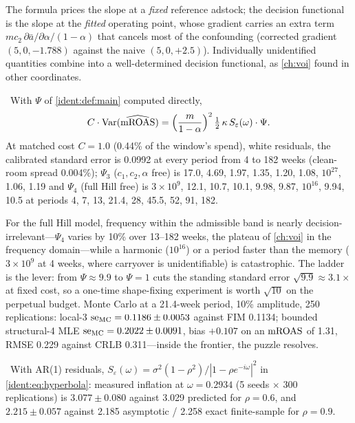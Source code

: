 The formula prices the slope at a \emph{fixed} reference adstock; the decision functional is the slope at the \emph{fitted} operating point, whose gradient carries an extra term $mc_2\,\partial\bar a/\partial\alpha/(1-\alpha)$ that cancels most of the confounding (corrected gradient $(5, 0, -1.788)$ against the naive $(5, 0, +2.5)$). Individually unidentified quantities combine into a well-determined decision functional, as \cref{ch:voi} found in other coordinates.

\begin{construction}
\label{ident:con:ladder}
\tagNumerical\ With $\Psi$ of \cref{ident:def:main} computed directly,
\begin{equation}
C\cdot\operatorname{Var}(\widehat{\mathrm{mROAS}}) = \Big(\frac{m}{1-\alpha}\Big)^2\,\tfrac12\,\kappa\,S_\varepsilon(\omega)\cdot\Psi.
\label{ident:eq:decisionfrontier}
\end{equation}
At matched cost $C = 1.0$ (0.44\% of the window's spend), white residuals, the calibrated standard error is 0.0992 at every period from 4 to 182 weeks (clean-room spread 0.004\%); $\Psi_3$ ($c_1, c_2, \alpha$ free) is 17.0, 4.69, 1.97, 1.35, 1.20, 1.08, $10^{27}$, 1.06, 1.19 and $\Psi_4$ (full Hill free) is $3\times10^9$, 12.1, 10.7, 10.1, 9.98, 9.87, $10^{16}$, 9.94, 10.5 at periods 4, 7, 13, 21.4, 28, 45.5, 52, 91, 182.
\end{construction}

For the full Hill model, frequency within the admissible band is nearly decision-irrelevant---$\Psi_4$ varies by 10\% over 13--182 weeks, the plateau of \cref{ch:voi} in the frequency domain---while a harmonic ($10^{16}$) or a period faster than the memory ($3\times10^9$ at 4 weeks, where carryover is unidentifiable) is catastrophic. The ladder is the lever: from $\Psi \approx 9.9$ to $\Psi = 1$ cuts the standing standard error $\sqrt{9.9} \approx 3.1\times$ at fixed cost, so a one-time shape-fixing experiment is worth $\sqrt{10}$ on the perpetual budget. Monte Carlo at a 21.4-week period, 10\% amplitude, 250 replications: local-3 $\mathrm{se}_{\rm MC} = 0.1186 \pm 0.0053$ against FIM 0.1134; bounded structural-4 MLE $\mathrm{se}_{\rm MC} = 0.2022 \pm 0.0091$, bias $+0.107$ on an $\mathrm{mROAS}$ of 1.31, RMSE 0.229 against CRLB 0.311---inside the frontier, the puzzle  resolves.

\begin{proposition}
\label{ident:prop:spectrum}
\tagEstablished\ With AR(1) residuals, $S_\varepsilon(\omega) = \sigma^2(1-\rho^2)/|1 - \rho e^{-i\omega}|^2$ in \cref{ident:eq:hyperbola}: measured inflation at $\omega = 0.2934$ (5 seeds $\times$ 300 replications) is $3.077 \pm 0.080$ against 3.029 predicted for $\rho = 0.6$, and $2.215 \pm 0.057$ against 2.185 asymptotic / 2.258 exact finite-sample for $\rho = 0.9$.
\end{proposition}

